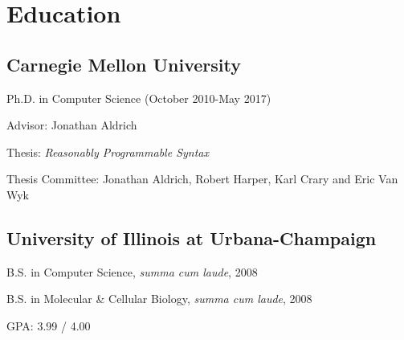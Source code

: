 \documentclass[10pt,letterpaper]{article}
\renewenvironment{itemize}{
  \begin{list}{}{
    \setlength{\leftmargin}{1.5em}
    \setlength{\itemsep}{0.25em}
    \setlength{\parskip}{0pt}
    \setlength{\parsep}{0.25em}
  }
}{
  \end{list}
}
\begin{document}
\section*{Education}

\subsection*{Carnegie Mellon University}

\begin{itemize}
  \item Ph.D. in Computer Science (October 2010-May 2017)
    \begin{itemize}
      \item Advisor: Jonathan Aldrich
      \item Thesis: \emph{Reasonably Programmable Syntax}
      \item Thesis Committee: Jonathan Aldrich, Robert Harper, Karl Crary and Eric Van Wyk
    \end{itemize}
\end{itemize}

\subsection*{University of Illinois at Urbana-Champaign}
\begin{itemize}
  \item B.S. in Computer Science, \textit{summa cum laude}, 2008
  \item B.S. in Molecular \& Cellular Biology, \textit{summa cum laude}, 2008
  \item GPA: 3.99 / 4.00
\end{itemize}
\end{document}
